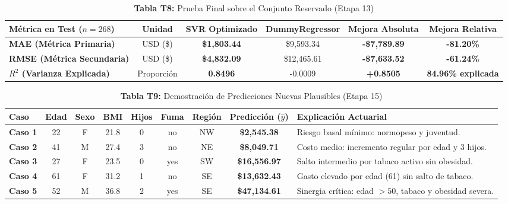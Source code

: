 \documentclass[11pt,a4paper]{article}
\begin{document}
\begin{table}[H]
\centering
\caption{\textbf{Tabla T8:} Prueba Final sobre el Conjunto Reservado (Etapa 13)}
\footnotesize
\begin{tabularx}{\textwidth}{l c c c c c}
\toprule
\textbf{Métrica en Test ($n=268$)} & \textbf{Unidad} & \textbf{SVR Optimizado} & \textbf{DummyRegressor} & \textbf{Mejora Absoluta} & \textbf{Mejora Relativa} \\
\midrule
\textbf{MAE (Métrica Primaria)} & USD (\$) & \textbf{\$1,803.44} & \$9,593.34 & \textbf{-\$7,789.89} & \textbf{-81.20\%} \\
\textbf{RMSE (Métrica Secundaria)} & USD (\$) & \textbf{\$4,832.09} & \$12,465.61 & \textbf{-\$7,633.52} & \textbf{-61.24\%} \\
\textbf{$R^2$ (Varianza Explicada)} & Proporción & \textbf{0.8496} & -0.0009 & \textbf{+0.8505} & \textbf{84.96\% explicada} \\
\bottomrule
\end{tabularx}
\end{table}

\begin{table}[H]
\centering
\caption{\textbf{Tabla T9:} Demostración de Predicciones Nuevas Plausibles (Etapa 15)}
\footnotesize
\begin{tabularx}{\textwidth}{l c c c c c c c p{4cm}}
\toprule
\textbf{Caso} & \textbf{Edad} & \textbf{Sexo} & \textbf{BMI} & \textbf{Hijos} & \textbf{Fuma} & \textbf{Región} & \textbf{Predicción ($\hat{y}$)} & \textbf{Explicación Actuarial} \\
\midrule
\textbf{Caso 1} & 22 & F & 21.8 & 0 & no & NW & \textbf{\$2,545.38} & Riesgo basal mínimo: normopeso y juventud. \\
\textbf{Caso 2} & 41 & M & 27.4 & 3 & no & NE & \textbf{\$8,049.71} & Costo medio: incremento regular por edad y 3 hijos. \\
\textbf{Caso 3} & 27 & F & 23.5 & 0 & yes & SW & \textbf{\$16,556.97} & Salto intermedio por tabaco activo sin obesidad. \\
\textbf{Caso 4} & 61 & F & 31.2 & 1 & no & SE & \textbf{\$13,632.43} & Gasto elevado por edad (61) sin salto de tabaco. \\
\textbf{Caso 5} & 52 & M & 36.8 & 2 & yes & SE & \textbf{\$47,134.61} & Sinergia crítica: edad $>50$, tabaco y obesidad severa. \\
\bottomrule
\end{tabularx}
\end{table}
\end{document}
